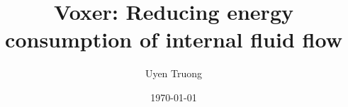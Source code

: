 
\def\thesislang{finnish} %

\def\secondlang{english} %

\author{Uyen Truong} %
\def\thesis{Thesis}%

\def\alaotsikko{Comparative testing of Voxer on water cooling piping system at Keravan Energy } %

\def\otsikko{Voxer: Reducing energy consumption of internal fluid flow}
\def\tutkinto{Bachelor of Engineering} %
\def\kohjelma{Environmental Engineering}
\def\suuntautumis{Water Resource Management}
\def\ohjaajat{
Titteli Etunimi Sukunimi\newline
Titteli Etunimi Sukunimi
}
\def\avainsanat{avainsanat}
\def\pvm{\specialdate\today}

\title{Voxer: Reducing energy consumption of internal fluid flow}
\def\metropoliadegree {Bachelor of Engineering} %
\def\metropoliadegreeprogramme {Environmental Engineering}
\def\metropoliaspecialisation {Water Resource Management}
\def\metropoliainstructors {
Kaj Lindedahl, Principal Lecturer, Metropolia UAS\newline
Prof. Juhani Pylkkänen, Chief Engineer, SansOx Ltd
}
\def\metropoliakeywords {SansOx, vortex, Voxer, fluid mechanics, reduce energy consumption, reduce turbulence, pressure loss}
\date{\longmonth\today}


